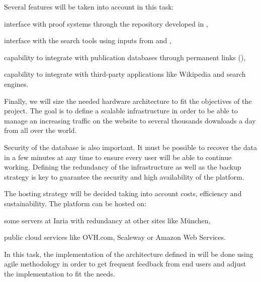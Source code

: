 \begin{workpackage}[id=access,type=RTD,wphases=1-48,
  short=Access,%
  title={Access},
  activity=tna,
  lead=Inr,InrRM=54,OcaRM=6]
\begin{tasklist}
\begin{task}[id=archi,
      title=Setting up the hardware and software architecture,
      shorttitle=Archi.,
      lead=Inr,InrRM=6,wphases=1-6]
    Several features will be taken into account in this task:
    \begin{compactitem}
    \item interface with proof systems through the repository developed
      in ,
    \item interface with the search tools using inputs from
       and ,
    \item capability to integrate with publication databases through
      permanent links (),
    \item capability to integrate with third-party applications like
      Wikipedia and search engines.
    \end{compactitem}

    Finally, we will size the needed hardware architecture to fit the
    objectives of the project. The goal is to define a scalable
    infrastructure in order to be able to manage an increasing traffic
    on the website to several thousands downloads a day from all over
    the world.

    Security of the database is also important. It must be possible to
    recover the data in a few minutes at any time to ensure every user
    will be able to continue working. Defining the redundancy of the
    infrastructure as well as the backup strategy is key to guarantee
    the security and high availability of the platform.

    The hosting strategy will be decided taking into account costs,
    efficiency and sustainability. The platform can be hosted on:
    \begin{compactitem}
    \item some servers at Inria with redundancy at other
      sites like München,
    \item public cloud services like OVH.com, Scaleway or Amazon
      Web Services.
    \end{compactitem}
  \end{task}

  \begin{task}[id=web,
      title=Giving access to the infrastructure on the Web,
      shorttitle=Web,
      lead=Inr,InrRM=12,wphases=7-18]
    In this task, the implementation of the architecture defined in
     will be done using agile methodology in
    order to get frequent feedback from end users and adjust the
    implementation to fit the needs.


\end{task}
\end{tasklist}
\end{workpackage}
